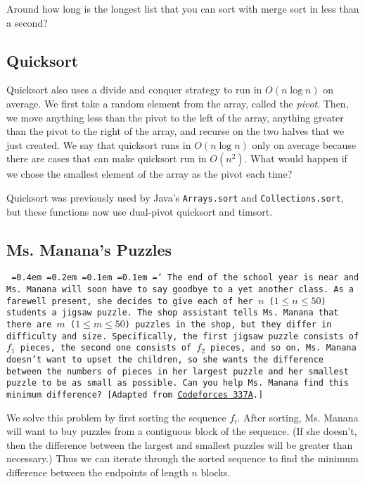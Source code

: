 Around how long is the longest list that you can sort with merge sort in less than a second?

\subsection{Quicksort}

Quicksort also uses a divide and conquer strategy to run in $O(n \log n)$ on average. We first take a random element from the array, called the \emph{pivot}. Then, we move anything less than the pivot to the left of the array, anything greater than the pivot to the right of the array, and recurse on the two halves that we just created. We say that quicksort runs in $O(n \log n)$ only on average because there are cases that can make quicksort run in $O(n^2)$. What would happen if we chose the smallest element of the array as the pivot each time?

Quicksort was previously used by Java's \texttt{Arrays.sort} and \texttt{Collections.sort}, but these functions now use dual-pivot quicksort and timsort.

\subsection{Ms. Manana's Puzzles}

\texttt{
  \font=0.4em%
  \font=0.2em%
  \font=0.1em%
  \font=0.1em%
  \hyphenchar\font=`\-%
  The end of the school year is near and Ms. Manana will soon have to say goodbye to a yet another class. As a farewell present, she decides to give each of her $n$ ($1\le n\le 50$) students a jigsaw puzzle. The shop assistant tells Ms. Manana that there are $m$ ($1\le m\le 50$) puzzles in the shop, but they differ in difficulty and size. Specifically, the first jigsaw puzzle consists of $f_1$ pieces, the second one consists of $f_2$ pieces, and so on. Ms. Manana doesn't want to upset the children, so she wants the difference between the numbers of pieces in her largest puzzle and her smallest puzzle to be as small as possible. Can you help Ms. Manana find this minimum difference? [Adapted from \href{http://codeforces.com/problemset/problem/337/A}{Codeforces 337A}.]
}

We solve this problem by first sorting the sequence $f_i$. After sorting, Ms. Manana will want to buy puzzles from a contiguous block of the sequence. (If she doesn't, then the difference between the largest and smallest puzzles will be greater than necessary.) Thus we can iterate through the sorted sequence to find the minimum difference between the endpoints of length $n$ blocks.

